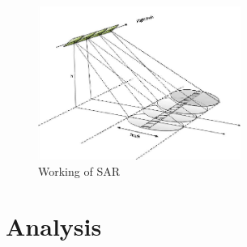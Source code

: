 \documentclass[twoside,10pt,a4paper]{article}
\numberwithin{equation}{section}					%
\numberwithin{figure}{section}						%
\begin{document}
\begin{figure}[h]
	\centering
	\includegraphics[height=5cm]{sar (2).png}	
	\caption{Working of SAR}
	\label{fig:1}			
\end{figure}




\section{Analysis}
\end{document}
